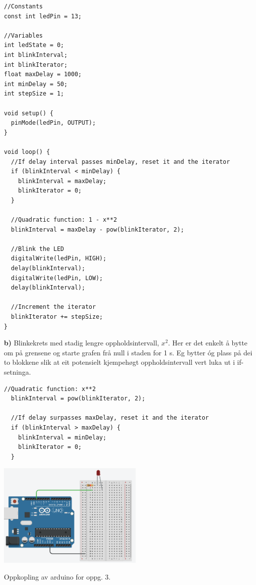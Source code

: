 \documentclass[12pt,a4paper]{article}
\begin{document}
  \begin{lstlisting}[language=Arduino, basicstyle=\small]
//Constants
const int ledPin = 13;

//Variables
int ledState = 0;
int blinkInterval;
int blinkIterator;
float maxDelay = 1000;
int minDelay = 50;
int stepSize = 1;

void setup() {
  pinMode(ledPin, OUTPUT);
}

void loop() {
  //If delay interval passes minDelay, reset it and the iterator
  if (blinkInterval < minDelay) {
    blinkInterval = maxDelay;
    blinkIterator = 0;
  }
  
  //Quadratic function: 1 - x**2
  blinkInterval = maxDelay - pow(blinkIterator, 2);

  //Blink the LED
  digitalWrite(ledPin, HIGH);
  delay(blinkInterval);
  digitalWrite(ledPin, LOW);
  delay(blinkInterval);
  
  //Increment the iterator
  blinkIterator += stepSize;
}
  \end{lstlisting}

  \newpage

  \textbf{b)} Blinkekrets med stadig lengre oppholdsintervall, $x^2$.
  Her er det enkelt å bytte om på grensene og starte grafen frå
  null i staden for 1 s. Eg bytter óg plass på dei to blokkene slik
  at eit potensielt kjempehøgt oppholdsintervall vert luka ut i
  if-setninga.

  \begin{lstlisting}[language=Arduino, basicstyle=\small]
  //Quadratic function: x**2
  blinkInterval = pow(blinkIterator, 2);

  //If delay surpasses maxDelay, reset it and the iterator
  if (blinkInterval > maxDelay) {
    blinkInterval = minDelay;
    blinkIterator = 0;
  }
  \end{lstlisting}

  \begin{center}
    \includegraphics[width=200pt]{01_3_a.png}
  \end{center}
  Oppkopling av arduino for oppg. 3.
\end{document}
